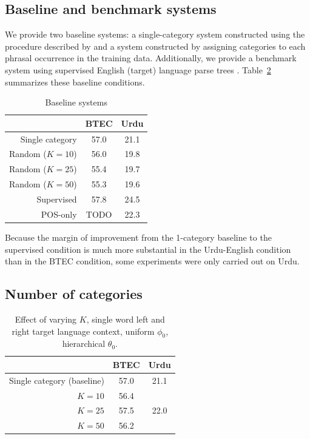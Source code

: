 \subsection{Baseline and benchmark systems}

We provide two baseline systems: a single-category system constructed using the procedure described by \cite{chiang:2007} and a system constructed by assigning categories to each phrasal occurrence in the training data.  Additionally, we provide a benchmark system using supervised English (target) language parse trees \citep{samt}.  Table~\ref{tab:npbaselines} summarizes these baseline conditions.

\begin{table}[h]
\caption{Baseline systems}
\begin{center}
\begin{tabular}{r|c|c}
& BTEC & Urdu \\
\hline
Single category \citep{chiang:2007} & 57.0 & 21.1 \\
\hline
Random ($K=10$) & 56.0 & 19.8 \\
Random ($K=25$) & 55.4 & 19.7 \\
Random ($K=50$) &  55.3 & 19.6 \\
\hline
Supervised \citep{samt} & 57.8 & 24.5 \\
POS-only & TODO & 22.3 \\
\end{tabular}
\end{center}
\label{tab:npbaselines}
\end{table}%

Because the margin of improvement from the 1-category baseline to the supervised condition is much more substantial in the Urdu-English condition than in the BTEC condition, some experiments were only carried out on Urdu.

\subsection{Number of categories}

\begin{table}[h]
\caption{Effect of varying $K$, single word left and right target language context, uniform $\phi_0$, hierarchical $\theta_0$.}
\begin{center}
\begin{tabular}{r|c|c}
& BTEC & Urdu \\
\hline
Single category (baseline) & 57.0 & 21.1 \\
\hline
$K=10$ & 56.4 & \\
$K=25$ & 57.5 & 22.0 \\
$K=50$ & 56.2 & \\
\end{tabular}
\end{center}
\label{tab:npbaselines}
\end{table}%



